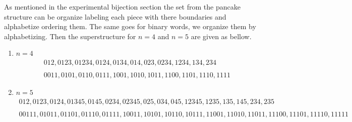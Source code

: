 \documentclass[a4paper,10pt]{article}
\begin{document}
As mentioned in the experimental bijection section the set from the pancake structure can be organize labeling each piece with there boundaries and alphabetize ordering them. The same goes for binary words, we organize them by alphabetizing. Then the superstructure for $n=4$ and $n=5$ are given as bellow. 

\begin{enumerate}
		\item $n=4$\\
		\[
		\boxed{
		\begin{gathered}
	{012,0123,01234,0124,0134,014,023,0234,1234,134,234} \\
	\\
	{0011, 0101, 0110, 0111, 1001, 1010, 1011, 1100, 1101, 1110, 1111}
		\end{gathered}
		}
		\]
		\item $n=5$\\
		\[
		\boxed{
		\begin{gathered}
		{012,0123,0124,01345,0145,0234,02345,025,034,045,12345,1235,135,145,234,235}\\
		\\
		{00111, 01011, 01101, 01110, 01111, 10011, 10101, 10110, 10111, 11001, 11010, 11011, 11100, 11101, 11110, 11111}\\ 
		\end{gathered}
		}
		\]
\end{enumerate}
\end{document}

